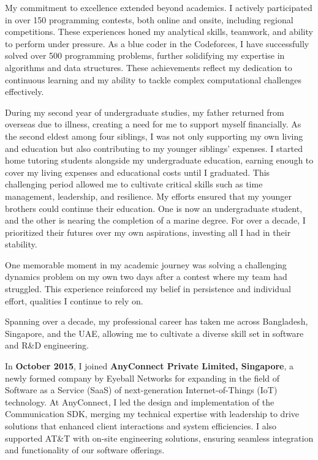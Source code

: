 \documentclass[11pt]{article}
\begin{document}
\ifshowsections{}\fi
\firstparagraph My commitment to excellence extended beyond academics. I actively participated in over 150 programming
contests, both online and onsite, including regional competitions. These experiences honed my analytical
skills, teamwork, and ability to perform under pressure. As a blue coder in the Codeforces, I have successfully
solved over 500 programming problems, further solidifying my expertise in algorithms and data structures.
These achievements reflect my dedication to continuous learning and my ability to tackle complex computational
challenges effectively.

\ifshowsections{}\fi
\firstparagraph During my second year of undergraduate studies, my father returned from overseas due to illness,
creating a need for me to support myself financially. As the second eldest among four siblings, I was
not only supporting my own living and education but also contributing to my younger siblings' expenses.
I started home tutoring students alongside my undergraduate education, earning enough to cover my
living expenses and educational costs until I graduated. This challenging period allowed me to cultivate
critical skills such as time management, leadership, and resilience. My efforts ensured that my younger
brothers could continue their education. One is now an undergraduate student, and the other is nearing the
completion of a marine degree. For over a decade, I prioritized their futures over my own aspirations,
investing all I had in their stability.

One memorable moment in my academic journey was solving a challenging dynamics problem on my own two days
after a contest where my team had struggled. This experience reinforced my belief in persistence and
individual effort, qualities I continue to rely on.

\ifshowsections{}\fi
\firstparagraph Spanning over a decade, my professional career has taken me across Bangladesh, Singapore, and the UAE,
allowing me to cultivate a diverse skill set in software and R\&D engineering.

In \textbf{October 2015}, I joined \textbf{AnyConnect Private Limited, Singapore}, a newly formed company by Eyeball
Networks for expanding in the field of Software as a Service (SaaS) of next-generation Internet-of-Things
(IoT) technology. At AnyConnect, I led the design and implementation of the Communication SDK,
merging my technical expertise with leadership to drive solutions that enhanced client interactions and
system efficiencies. I also supported AT\&T with on-site engineering solutions, ensuring seamless integration and
functionality of our software offerings.
\end{document}

